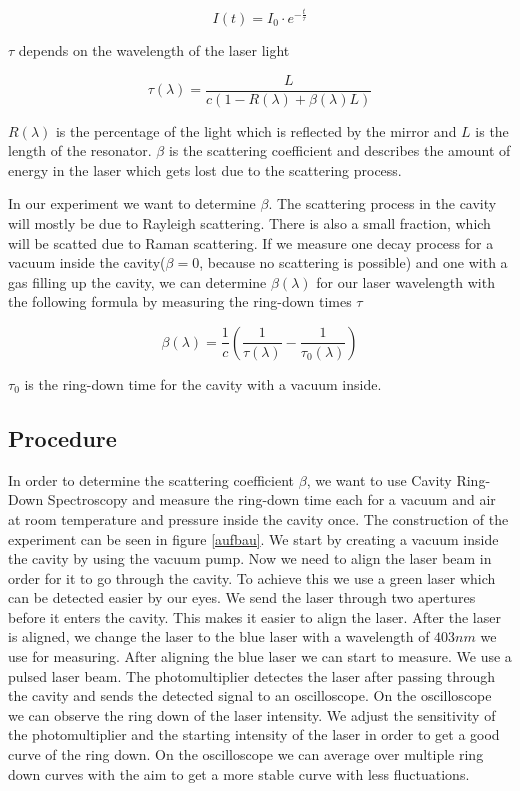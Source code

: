 \documentclass[12pt,a4paper]{article}
\begin{document}
\begin{equation}
I(t) = I_0 \cdot e^{- \frac{t}{\tau}}
\end{equation}

$\tau$ depends on the wavelength of the laser light

\begin{equation}
\tau (\lambda) = \frac{L}{c (1- R(\lambda) + \beta(\lambda) L)}
\end{equation}

$R(\lambda)$ is the percentage of the light which is reflected by the mirror and $L$ is the length of the resonator. $\beta$ is the scattering coefficient and describes the amount of energy in the laser which gets lost due to the scattering process.

In our experiment we want to determine $\beta$. The scattering process in the cavity will mostly be due to Rayleigh scattering. There is also a small fraction, which will be scatted due to Raman scattering. If we measure one decay process for a vacuum inside the cavity($\beta = 0$, because no scattering is possible) and one with a gas filling up the cavity, we can determine $\beta(\lambda)$ for our laser wavelength with the following formula by measuring the ring-down times $\tau$

\begin{equation}
\beta(\lambda) = \frac{1}{c} (\frac{1}{\tau(\lambda)} - \frac{1}{\tau_0(\lambda)})
\end{equation}

$\tau_0$ is the ring-down time for the cavity with a vacuum inside.

\subsection{Procedure}

In order to determine the scattering coefficient $\beta$, we want to use Cavity Ring-Down Spectroscopy and measure the ring-down time each for a vacuum and air at room temperature and pressure inside the cavity once. The construction of the experiment can be seen in figure \ref{aufbau}.
We start by creating a vacuum inside the cavity by using the vacuum pump. Now we need to align the laser beam in order for it to go through the cavity. To achieve this we use a green laser which can be detected easier by our eyes. We send the laser through two apertures before it enters the cavity. This makes it easier to align the laser. After the laser is aligned, we change the laser to the blue laser with a wavelength of $403 nm$ we use for measuring. After aligning the blue laser we can start to measure. We use a pulsed laser beam. The photomultiplier detectes the laser after passing through the cavity and sends the detected signal to an oscilloscope. On the oscilloscope we can observe the ring down of the laser intensity. We adjust the sensitivity of the photomultiplier and the starting intensity of the laser in order to get a good curve of the ring down. On the oscilloscope we can average over multiple ring down curves with the aim to get a more stable curve with less fluctuations. 
\end{document}
